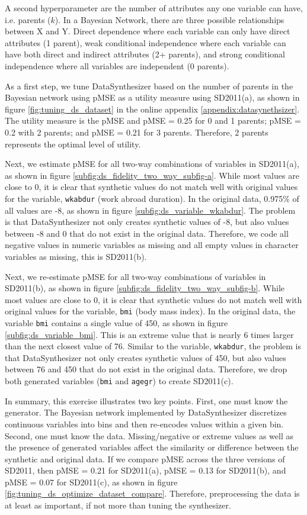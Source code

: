 \documentclass[runningheads]{llncs}
\begin{document}
A second hyperparameter are the number of attributes any one variable can have, i.e. parents ($k$).  In a Bayesian Network, there are three possible relationships between X and Y.  Direct dependence where each variable can only have direct attributes (1 parent), weak conditional independence where each variable can have both direct and indirect attributes (2+ parents), and strong conditional independence where all variables are independent (0 parents).  

As a first step, we tune DataSynthesizer based on the number of parents in the Bayesian network using pMSE as a utility measure using SD2011(a), as shown in figure \ref{fig:tuning_ds_dataset} in the online appendix \ref{appendix:datasynethsizer}.  The utility measure is the pMSE and pMSE = 0.25 for 0 and 1 parents; pMSE = 0.2 with 2 parents; and pMSE = 0.21 for 3 parents.  Therefore, 2 parents represents the optimal level of utility.

Next, we estimate pMSE for all two-way combinations of variables in SD2011(a), as shown in figure \ref{subfig:ds_fidelity_two_way_subfig-a}.  While most values are close to 0, it is clear that synthetic values do not match well with original values for the variable, \texttt{wkabdur} (work abroad duration).  In the original data, 0.975\% of all values are -8, as shown in figure \ref{subfig:ds_variable_wkabdur}.  The problem is that DataSynthesizer not only creates synthetic values of -8, but also values between -8 and 0 that do not exist in the original data.  Therefore, we code all negative values in numeric variables as missing and all empty values in character variables as missing, this is SD2011(b).

Next, we re-estimate pMSE for all two-way combinations of variables in SD2011(b), as shown in figure \ref{subfig:ds_fidelity_two_way_subfig-b}.  While most values are close to 0, it is clear that synthetic values do not match well with original values for the variable, \texttt{bmi} (body mass index).  In the original data, the variable \texttt{bmi} contains a single value of 450, as shown in figure \ref{subfig:ds_variable_bmi}.  This is an extreme value that is nearly 6 times larger than the next closest value of 76.  Similar to the variable, \texttt{wkabdur}, the problem is that DataSynthesizer not only creates synthetic values of 450, but also values between 76 and 450 that do not exist in the original data.  Therefore, we drop both generated variables (\texttt{bmi} and \texttt{agegr}) to create SD2011(c).

In summary, this exercise illustrates two key points.  First, one must know the generator.  The Bayesian network implemented by DataSynthesizer discretizes continuous variables into bins and then re-encodes values within a given bin.  Second, one must know the data.  Missing/negative or extreme values as well as the presence of generated variables affect the similarity or difference between the synthetic and original data.  If we compare pMSE across the three versions of SD2011, then  pMSE = 0.21 for SD2011(a), pMSE = 0.13 for SD2011(b), and pMSE = 0.07 for SD2011(c), as shown in figure \ref{fig:tuning_ds_optimize_dataset_compare}.  Therefore, preprocessing the data is at least as important, if not more than tuning the synthesizer.
\end{document}
